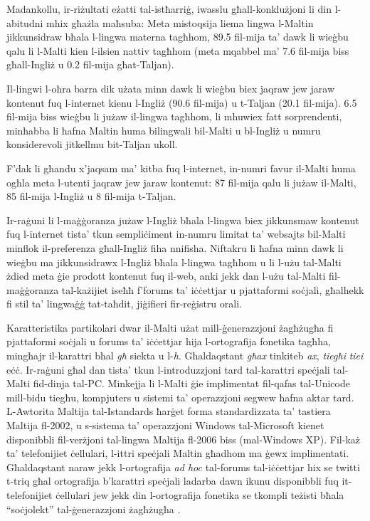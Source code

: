 \documentclass[]{../../metanetpaper}
\begin{document}
\begin{multicols}{2}
Madankollu, ir-riżultati eżatti tal-istħarriġ, iwasslu għall-konklużjoni li din l-abitudni mhix għażla maħsuba: Meta mistoqsija liema lingwa l-Maltin jikkunsidraw bħala l-lingwa materna tagħhom, 89.5 fil-mija ta’ dawk li wieġbu qalu li l-Malti kien l-ilsien nattiv tagħhom (meta mqabbel ma’ 7.6 fil-mija biss għall-Ingliż u 0.2 fil-mija għat-Taljan).
    
Il-lingwi l-oħra barra dik użata minn dawk li wieġbu biex jaqraw jew jaraw kontenut fuq l-internet kienu l-Ingliż (90.6 fil-mija) u t-Taljan (20.1 fil-mija). 6.5 fil-mija biss wieġbu li jużaw il-lingwa tagħhom, li mhuwiex fatt sorprendenti, minħabba li ħafna Maltin huma bilingwali bil-Malti u bl-Ingliż u numru konsiderevoli jitkellmu bit-Taljan ukoll.
    
F’dak li għandu x’jaqsam ma’ kitba fuq l-internet, in-numri favur il-Malti huma ogħla meta l-utenti jaqraw jew jaraw kontenut: 87 fil-mija qalu li jużaw il-Malti, 85 fil-mija l-Ingliż u 8 fil-mija t-Taljan.
    
Ir-raġuni li l-maġġoranza jużaw l-Ingliż bħala l-lingwa biex jikkunsmaw kontenut fuq l-internet tista’ tkun sempliċiment in-numru limitat ta’ websajts bil-Malti minflok il-preferenza għall-Ingliż fiha nnifisha. Niftakru li ħafna minn dawk li wieġbu ma jikkunsidrawx l-Ingliż bħala l-lingwa tagħhom u li l-użu tal-Malti żdied meta ġie prodott kontenut fuq il-web, anki jekk dan l-użu tal-Malti fil-maġġoranza tal-każijiet iseħħ f’forums ta’ iċċettjar u pjattaformi soċjali, għalhekk fi stil ta’ lingwaġġ tat-taħdit, jiġifieri fir-reġistru orali.
    
Karatteristika partikolari dwar il-Malti użat mill-ġenerazzjoni żagħżugħa fi pjattaformi soċjali u forums ta’ iċċettjar hija l-ortografija fonetika tagħha, mingħajr il-karattri bħal \emph{għ} siekta u l-\emph{h}. Għaldaqstant \emph{għax} tinkiteb \emph{ax}, \emph{tiegħi} \emph{tiei} eċċ. Ir-raġuni għal dan tista’ tkun l-introduzzjoni tard tal-karattri speċjali tal-Malti fid-dinja tal-PC. Minkejja li l-Malti ġie implimentat fil-qafas tal-Unicode mill-bidu tiegħu, kompjuters u sistemi ta’ operazzjoni segwew ħafna aktar tard. L-Awtorita Maltija tal-Istandards ħarġet forma standardizzata ta’ tastiera Maltija fl-2002, u s-sistema ta’ operazzjoni Windows tal-Microsoft kienet disponibbli fil-verżjoni tal-lingwa Maltija fl-2006 biss (mal-Windows XP). Fil-każ ta’ telefonijiet ċellulari, l-ittri speċjali Maltin għadhom ma ġewx implimentati. Għaldaqstant naraw jekk l-ortografija \emph{ad hoc} tal-forums tal-iċċettjar hix se twitti t-triq għal ortografija b’karattri speċjali ladarba dawn ikunu disponibbli fuq it-telefonijiet ċellulari jew jekk din l-ortografija fonetika se tkompli teżisti bħala ``soċjolekt'' tal-ġenerazzjoni żagħżugħa \cite{Fabri:2011b}.
    

\end{multicols}
\end{document}
